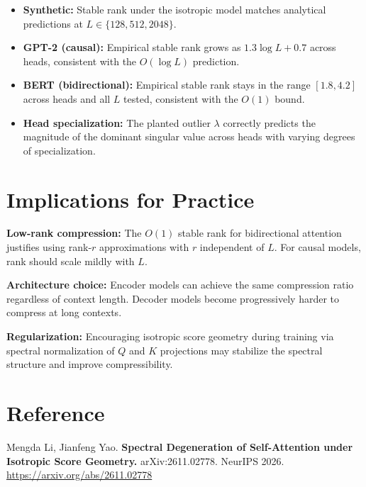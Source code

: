 \documentclass[10pt,twocolumn]{article}
\begin{document}
\begin{itemize}[itemsep=2pt,parsep=0pt]
  \item \textbf{Synthetic:} Stable rank under the isotropic model
    matches analytical predictions at $L \in \{128, 512, 2048\}$.
  \item \textbf{GPT-2 (causal):} Empirical stable rank grows as
    $1.3 \log L + 0.7$ across heads, consistent with the $O(\log L)$
    prediction.
  \item \textbf{BERT (bidirectional):} Empirical stable rank stays in
    the range $[1.8, 4.2]$ across heads and all $L$ tested, consistent
    with the $O(1)$ bound.
  \item \textbf{Head specialization:} The planted outlier $\lambda$
    correctly predicts the magnitude of the dominant singular value
    across heads with varying degrees of specialization.
\end{itemize}

\section{Implications for Practice}

\textbf{Low-rank compression:} The $O(1)$ stable rank for bidirectional
attention justifies using rank-$r$ approximations with $r$ independent
of $L$. For causal models, rank should scale mildly with $L$.

\textbf{Architecture choice:} Encoder models can achieve the same
compression ratio regardless of context length. Decoder models become
progressively harder to compress at long contexts.

\textbf{Regularization:} Encouraging isotropic score geometry during
training via spectral normalization of $Q$ and $K$ projections may
stabilize the spectral structure and improve compressibility.

\section*{Reference}

Mengda Li, Jianfeng Yao.
\textbf{Spectral Degeneration of Self-Attention under Isotropic Score
Geometry.}
arXiv:2611.02778. NeurIPS 2026.
\url{https://arxiv.org/abs/2611.02778}
\end{document}
